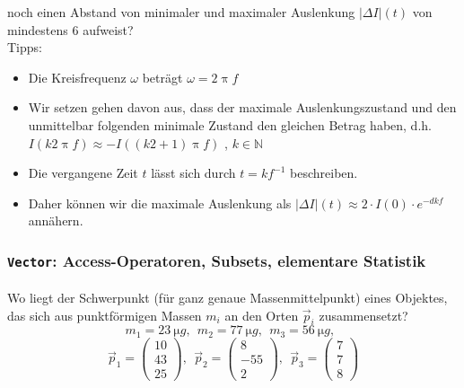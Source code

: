 \documentclass[paper=A4, pagesize, DIV=calc, smallheadings,
fontsize=12pt, expansion=false]{scrreprt}
\begin{document}
noch einen Abstand von minimaler und maximaler Auslenkung $|\Delta I|(t)$ von mindestens \SI{6}{} aufweist?\\
Tipps: 
\begin{itemize}
  \item Die Kreisfrequenz $\omega$ beträgt $\omega = 2 \uppi f$
  \item Wir setzen gehen davon aus, dass der maximale Auslenkungszustand und den unmittelbar folgenden minimale Zustand 
  den gleichen Betrag haben, d.h. $I(k2\uppi f) \approx -I\left( \left(k2 + 1 \right) \uppi f\right)$ , $k \in 
  \mathbb{N}$
  \item Die vergangene Zeit $t$ lässt sich durch $t = k f^{-1}$ beschreiben.
  \item Daher können wir die maximale Auslenkung als $|\Delta I|(t) \approx 2 \cdot I(0) \cdot  e^{-dkf} $ 
  annähern.
\end{itemize}



\subsubsection*{\texttt{\textbf{Vector}}: Access-Operatoren, Subsets, elementare Statistik}

\paragraph{}
Wo liegt der Schwerpunkt (für ganz genaue \glqq Massenmittelpunkt\grqq) eines Objektes, das sich aus punktförmigen 
Massen $m_i$ an 
den Orten $\vec{p}_i$ zusammensetzt?
\[
m_1 = \SI{23}{\micro g},~~ 
m_2 = \SI{77}{\micro g},~~
m_3 = \SI{56}{\micro g},~~
 \]
 \[
\vec{p}_1 = \begin{pmatrix}10 \\ 43 \\ 25\end{pmatrix},~~ 
\vec{p}_2 = \begin{pmatrix}8 \\ -55 \\ 2\end{pmatrix},~~ 
\vec{p}_3 = \begin{pmatrix}7 \\ 7 \\ 8\end{pmatrix}
\]
\end{document}
